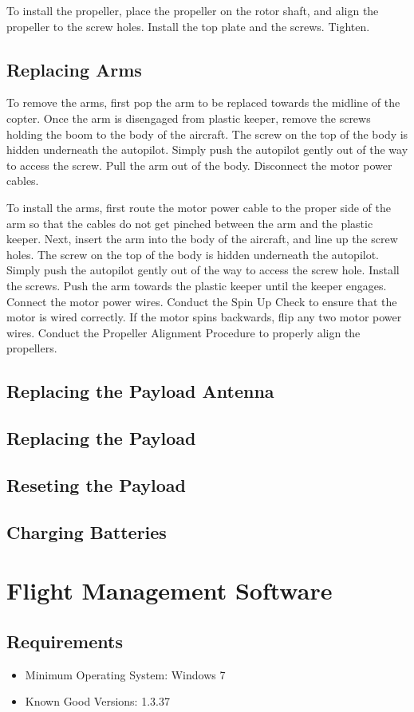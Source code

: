\documentclass{report}
\begin{document}
		To install the propeller, place the propeller on the rotor shaft, and align the propeller to the screw holes.  Install the top plate and the screws.  Tighten.
	\section{Replacing Arms}
		To remove the arms, first pop the arm to be replaced towards the midline of the copter.  Once the arm is disengaged from plastic keeper, remove the screws holding the boom to the body of the aircraft.  The screw on the top of the body is hidden underneath the autopilot.  Simply push the autopilot gently out of the way to access the screw.  Pull the arm out of the body.  Disconnect the motor power cables.

		To install the arms, first route the motor power cable to the proper side of the arm so that the cables do not get pinched between the arm and the plastic keeper.  Next, insert the arm into the body of the aircraft, and line up the screw holes.  The screw on the top of the body is hidden underneath the autopilot.  Simply push the autopilot gently out of the way to access the screw hole.  Install the screws.  Push the arm towards the plastic keeper until the keeper engages.  Connect the motor power wires.  Conduct the Spin Up Check to ensure that the motor is wired correctly.  If the motor spins backwards, flip any two motor power wires.  Conduct the Propeller Alignment Procedure to properly align the propellers.
	\section{Replacing the Payload Antenna}
	\section{Replacing the Payload}
	\section{Reseting the Payload}
	\section{Charging Batteries}
\chapter{Flight Management Software}
	\section{Requirements}
		\begin{itemize}
			\item Minimum Operating System: Windows 7
			\item Known Good Versions: 1.3.37
		\end{itemize}
\end{document}
